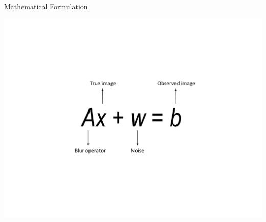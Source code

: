 \documentclass[12pt]{beamer}
\begin{document}
\begin{frame}{Mathematical Formulation}
\begin{center}
\includegraphics[scale=0.75]{linearModel}
\end{center}
\end{frame}

%
%
%
%
\end{document}
